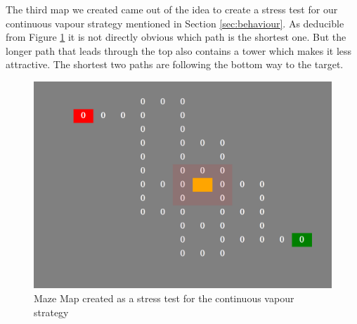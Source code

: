 The third map we created came out of the idea to create a stress test for our continuous vapour strategy mentioned in Section \ref{sec:behaviour}. As deducible from Figure \ref{fig:mapsmaze} it is not directly obvious which path is the shortest one. But the longer path that leads through the top also contains a tower which makes it less attractive. The shortest two paths are following the bottom way to the target.

\begin{figure}[H]
  \centering
  \includegraphics[width=1\linewidth]{images/map_maze}
  \caption{Maze Map created as a stress test for the continuous vapour strategy}
  \label{fig:mapsmaze}
\end{figure}
